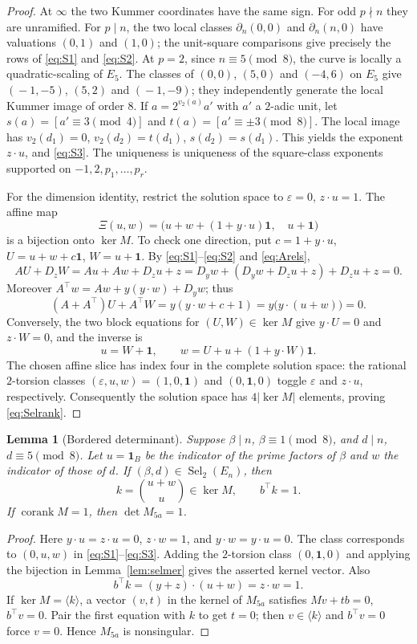 \documentclass[11pt,a4paper]{article}
\newtheorem{lemma}[theorem]{Lemma}
\theoremstyle{definition}
\newcommand{\corank}{\operatorname{corank}}
\newcommand{\Sel}{\operatorname{Sel}_2}
\newcommand{\one}{\boldsymbol{1}}
\begin{document}
\begin{proof}
At $\infty$ the two Kummer coordinates have the same sign.
For odd $p\nmid n$ they are unramified.  For $p\mid n$,
the two local classes $\partial_n(0,0)$ and
$\partial_n(n,0)$ have valuations $(0,1)$ and $(1,0)$;
the unit-square comparisons give precisely the rows of
\eqref{eq:S1} and \eqref{eq:S2}.  At $p=2$, since
$n\equiv5\pmod8$, the curve is locally a quadratic-scaling
of $E_5$.  The classes of $(0,0)$, $(5,0)$ and $(-4,6)$ on
$E_5$ give $(\!-1,-5)$, $(5,2)$ and $(\!-1,-9)$;
they independently generate the local Kummer image of order
$8$.  If $a=2^{v_2(a)}a'$ with $a'$ a $2$-adic unit,
let $s(a)=[a'\equiv3\pmod4]$ and
$t(a)=[a'\equiv\pm3\pmod8]$.  The local image has
$v_2(d_1)=0$, $v_2(d_2)=t(d_1)$, $s(d_2)=s(d_1)$.
This yields the exponent $z\cdot u$, and \eqref{eq:S3}.
The uniqueness is uniqueness of the square-class exponents
supported on $-1,2,p_1,\ldots,p_r$.

For the dimension identity, restrict the solution space to
$\varepsilon=0$, $z\cdot u=1$.  The affine map
\[
 \Xi(u,w)=\bigl(u+w+(1+y\cdot u)\one,\quad u+\one\bigr)
\]
is a bijection onto $\ker M$.  To check one direction,
put $c=1+y\cdot u$, $U=u+w+c\one$, $W=u+\one$.
By \eqref{eq:S1}--\eqref{eq:S2} and \eqref{eq:Arels},
\[
 AU+D_zW
 =Au+Aw+D_zu+z
 =D_yw+(D_yw+D_zu+z)+D_zu+z=0.
\]
Moreover $A^\top w=A w+y(y\cdot w)+D_yw$; thus
\[
 (A+A^\top)U+A^\top W
          =y(y\cdot w+c+1)=y\bigl(y\cdot(u+w)\bigr)=0.
\]
Conversely, the two block equations for $(U,W)\in\ker M$
give $y\cdot U=0$ and $z\cdot W=0$, and the inverse is
\[
 u=W+\one,\qquad w=U+u+(1+y\cdot W)\one.
\]
The chosen affine slice has index four in the complete
solution space: the rational $2$-torsion classes
$(\varepsilon,u,w)=(1,0,\one)$ and $(0,\one,0)$ toggle
$\varepsilon$ and $z\cdot u$, respectively.  Consequently
the solution space has $4|\ker M|$ elements, proving
\eqref{eq:Selrank}.
\end{proof}

\begin{lemma}[Bordered determinant]\label{lem:border}
Suppose $\beta\mid n$, $\beta\equiv1\pmod8$, and
$d\mid n$, $d\equiv5\pmod8$.  Let $u=\one_B$ be the
indicator of the prime factors of $\beta$ and $w$ the
indicator of those of $d$.  If $(\beta,d)\in\Sel(E_n)$,
then
\[
       k=\binom{u+w}{u}\in\ker M,\qquad b^\top k=1.
\]
If $\corank M=1$, then $\det M_{5a}=1$.
\end{lemma}
\begin{proof}
Here $y\cdot u=z\cdot u=0$, $z\cdot w=1$, and
$y\cdot w=y\cdot u=0$.  The class corresponds to
$(0,u,w)$ in \eqref{eq:S1}--\eqref{eq:S3}.  Adding the
$2$-torsion class $(0,\one,0)$ and applying the bijection
in Lemma~\ref{lem:selmer} gives the asserted kernel vector.
Also
\[
 b^\top k=(y+z)\cdot(u+w)=z\cdot w=1.
\]
If $\ker M=\langle k\rangle$, a vector $(v,t)$ in the kernel
of $M_{5a}$ satisfies $Mv+tb=0$, $b^\top v=0$.
Pair the first equation with $k$ to get $t=0$;
then $v\in\langle k\rangle$ and $b^\top v=0$ force $v=0$.
Hence $M_{5a}$ is nonsingular.
\end{proof}
\end{document}
